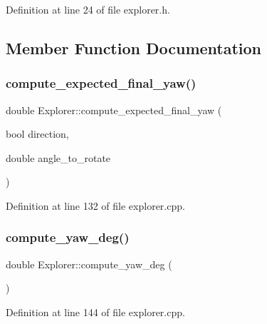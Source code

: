 Definition at line 24 of file explorer.\+h.



\subsection{Member Function Documentation}
\mbox{\label{class_explorer_a02c37b93448ed474f1bf0d03e2758ca2}} 
\subsubsection{\texorpdfstring{compute\+\_\+expected\+\_\+final\+\_\+yaw()}{compute\_expected\_final\_yaw()}}
{\footnotesize\ttfamily double Explorer\+::compute\+\_\+expected\+\_\+final\+\_\+yaw (\begin{DoxyParamCaption}\item[{bool}]{direction,  }\item[{double}]{angle\+\_\+to\+\_\+rotate }\end{DoxyParamCaption})}



Definition at line 132 of file explorer.\+cpp.

\mbox{\label{class_explorer_a670cdffdb8c3173c300590cfc45ab6d2}} 
\subsubsection{\texorpdfstring{compute\+\_\+yaw\+\_\+deg()}{compute\_yaw\_deg()}}
{\footnotesize\ttfamily double Explorer\+::compute\+\_\+yaw\+\_\+deg (\begin{DoxyParamCaption}{ }\end{DoxyParamCaption})}



Definition at line 144 of file explorer.\+cpp.

\mbox{\label{class_explorer_ac5b91cd64189a60ffe62535cb5bc093a}} 
